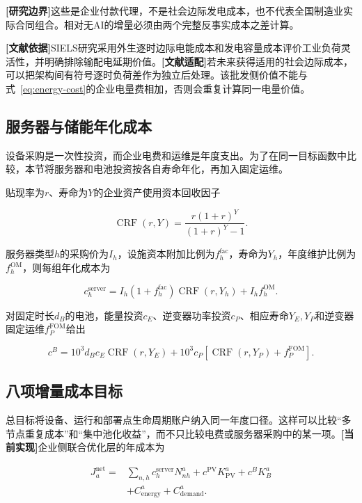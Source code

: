 \documentclass[preprint]{elsarticle}
\newcommand{\implemented}{\textcolor{green!40!black}{\textbf{[当前实现]}}}
\newcommand{\literature}{\textcolor{blue!70!black}{\textbf{[文献依据]}}}
\newcommand{\adapted}{\textcolor{violet!75!black}{\textbf{[文献适配]}}}
\newcommand{\boundary}{\textcolor{black!65}{\textbf{[研究边界]}}}
\begin{document}
\boundary 这些是企业付款代理，不是社会边际发电成本，也不代表全国制造业实际合同组合。相对无AI的增量必须由两个完整反事实成本之差计算。

\literature SIELS研究采用外生逐时边际电能成本和发电容量成本评价工业负荷灵活性，并明确排除输配电延期价值。\adapted 若未来获得适用的社会边际成本，可以把架构间有符号逐时负荷差作为独立后处理。该批发侧价值不能与式~\eqref{eq:energy-cost}的企业电量费相加，否则会重复计算同一电量价值。

\subsection{服务器与储能年化成本}

设备采购是一次性投资，而企业电费和运维是年度支出。为了在同一目标函数中比较，本节将服务器和电池投资按各自寿命年化，再加入固定运维。

贴现率为$r$、寿命为$Y$的企业资产使用资本回收因子

\begin{equation}
 \operatorname{CRF}(r,Y)=\frac{r(1+r)^Y}{(1+r)^Y-1}.
 \label{eq:crf}
\end{equation}

服务器类型$h$的采购价为$I_h$，设施资本附加比例为$f_h^{\mathrm{fac}}$，寿命为$Y_h$，年度维护比例为$f_h^{\mathrm{OM}}$，则每组年化成本为

\begin{equation}
 c_h^{\mathrm{server}}
 =I_h(1+f_h^{\mathrm{fac}})\operatorname{CRF}(r,Y_h)
 +I_hf_h^{\mathrm{OM}}.
 \label{eq:server-cost}
\end{equation}

对固定时长$d_B$的电池，能量投资$c_E$、逆变器功率投资$c_P$、相应寿命$Y_E,Y_P$和逆变器固定运维$f_P^{\mathrm{FOM}}$给出

\begin{equation}
 c^B=10^3d_Bc_E\operatorname{CRF}(r,Y_E)
 +10^3c_P[\operatorname{CRF}(r,Y_P)+f_P^{\mathrm{FOM}}].
 \label{eq:battery-cost}
\end{equation}

\subsection{八项增量成本目标}

总目标将设备、运行和部署点生命周期账户纳入同一年度口径。这样可以比较“多节点重复成本”和“集中池化收益”，而不只比较电费或服务器采购中的某一项。\implemented 企业侧联合优化层的年成本为

\begin{equation}
\begin{aligned}
 J_a^{\mathrm{net}}={}&
 \sum_{n,h}c_h^{\mathrm{server}}N^a_{nh}
 +c^{\mathrm{PV}}K^a_{\mathrm{PV}}
 +c^BK^a_B\\
 &+C^a_{\mathrm{energy}}+C^a_{\mathrm{demand}}.
\end{aligned}
 \label{eq:network-objective}
\end{equation}
\end{document}

